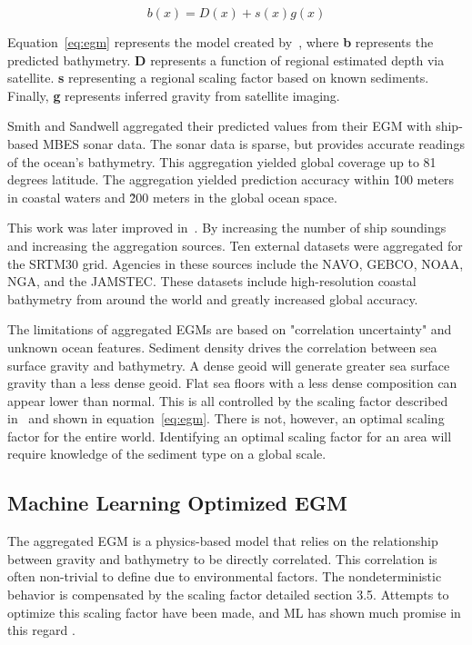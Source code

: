 \begin{equation}
    b(x) = D(x) + s(x)g(x) \label{eq:egm}
\end{equation}

\par
Equation~\ref{eq:egm} represents the model created by~\cite{smith1994bathymetric}, where \textbf{b} represents the predicted bathymetry.
\textbf{D} represents a function of regional estimated depth via satellite.
\textbf{s} representing a regional scaling factor based on known sediments.
Finally, \textbf{g} represents inferred gravity from satellite imaging.

\par
Smith and Sandwell aggregated their predicted values from their \ac{EGM} with ship-based \ac{MBES} sonar data.
The sonar data is sparse, but provides accurate readings of the ocean's bathymetry.
This aggregation yielded global coverage up to 81 degrees latitude.
The aggregation yielded prediction accuracy within \~100 meters in coastal waters and \~200 meters in the global ocean space.

\par 
This work was later improved in~\cite{becker2009global}.
By increasing the number of ship soundings and increasing the aggregation sources.
Ten external datasets were aggregated for the SRTM30 grid.
Agencies in these sources include the \ac{NAVO}, \ac{GEBCO}, \ac{NOAA}, \ac{NGA}, and the \ac{JAMSTEC}.
These datasets include high-resolution coastal bathymetry from around the world and greatly increased global accuracy.

\par
The limitations of aggregated \ac{EGM}s are based on "correlation uncertainty" and unknown ocean features.
Sediment density drives the correlation between sea surface gravity and bathymetry.
A dense geoid will generate greater sea surface gravity than a less dense geoid.
Flat sea floors with a less dense composition can appear lower than normal.
This is all controlled by the scaling factor described in~\cite{smith1994bathymetric} and shown in equation~\ref{eq:egm}.
There is not, however, an optimal scaling factor for the entire world.
Identifying an optimal scaling factor for an area will require knowledge of the sediment type on a global scale.


\subsection{Machine Learning Optimized \ac{EGM}}\label{subsec:machine-learning-optimizedac}
The aggregated \ac{EGM} is a physics-based model that relies on the relationship between gravity and bathymetry to be directly correlated.
This correlation is often non-trivial to define due to environmental factors.
The nondeterministic behavior is compensated by the scaling factor detailed section 3.5.
Attempts to optimize this scaling factor have been made, and \ac{ML} has shown much promise in this regard \cite{jena2012prediction}.

